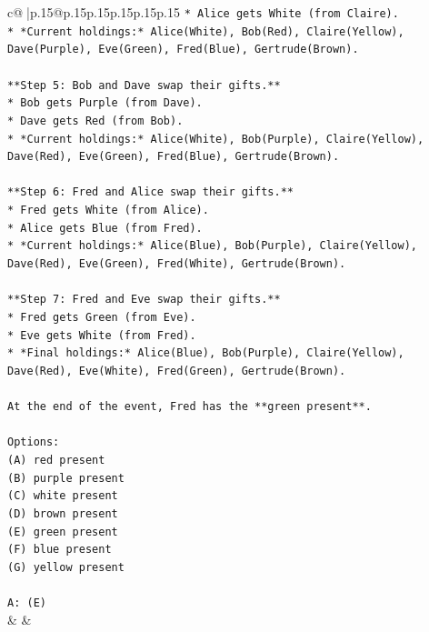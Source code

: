 \documentclass{article}
\begin{document}
{\begin{supertabular}{c@{$\;$}|p{.15\linewidth}@{}p{.15\linewidth}p{.15\linewidth}p{.15\linewidth}p{.15\linewidth}p{.15\linewidth}}
{{{\texttt{*   Alice gets White (from Claire).} \\
\texttt{*   *Current holdings:* Alice(White), Bob(Red), Claire(Yellow), Dave(Purple), Eve(Green), Fred(Blue), Gertrude(Brown).} \\
\\ 
\texttt{**Step 5: Bob and Dave swap their gifts.**} \\
\texttt{*   Bob gets Purple (from Dave).} \\
\texttt{*   Dave gets Red (from Bob).} \\
\texttt{*   *Current holdings:* Alice(White), Bob(Purple), Claire(Yellow), Dave(Red), Eve(Green), Fred(Blue), Gertrude(Brown).} \\
\\ 
\texttt{**Step 6: Fred and Alice swap their gifts.**} \\
\texttt{*   Fred gets White (from Alice).} \\
\texttt{*   Alice gets Blue (from Fred).} \\
\texttt{*   *Current holdings:* Alice(Blue), Bob(Purple), Claire(Yellow), Dave(Red), Eve(Green), Fred(White), Gertrude(Brown).} \\
\\ 
\texttt{**Step 7: Fred and Eve swap their gifts.**} \\
\texttt{*   Fred gets Green (from Eve).} \\
\texttt{*   Eve gets White (from Fred).} \\
\texttt{*   *Final holdings:* Alice(Blue), Bob(Purple), Claire(Yellow), Dave(Red), Eve(White), Fred(Green), Gertrude(Brown).} \\
\\ 
\texttt{At the end of the event, Fred has the **green present**.} \\
\\ 
\texttt{Options:} \\
\texttt{(A) red present} \\
\texttt{(B) purple present} \\
\texttt{(C) white present} \\
\texttt{(D) brown present} \\
\texttt{(E) green present} \\
\texttt{(F) blue present} \\
\texttt{(G) yellow present} \\
\\ 
\texttt{A: (E)} \\
            }
        }
    }
    & & \\ \\


\end{supertabular}}
\end{document}
